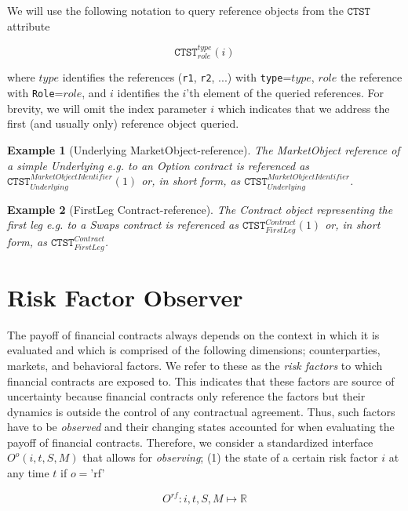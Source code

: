 \documentclass[9pt,oneside]{amsart}
\newtheorem{example}{Example}
\newcommand{\Real}{\mathbb{R}}
\newcommand{\attr}[1]{\texttt{#1}}
\newcommand{\obsfull}[5]{O^{#1}(#2,#3,#4,#5)}
\newcommand{\obsfunc}[1]{O^{#1}}
\begin{document}
\begin{multicols}{2}
We will use the following notation to query reference objects from the $\attr{CTST}$ attribute

\[
	\attr{CTST}_{role}^{type}(i)
\]

where $type$ identifies the references (\verb'r1', \verb'r2', ...) with \verb'type'=$type$, $role$ the reference with \verb'Role'=$role$, and $i$ identifies the $i$'th element of the queried references. For brevity, we will omit the index parameter $i$ which indicates that we address the first (and usually only) reference object queried.

\begin{example}[Underlying MarketObject-reference] The MarketObject reference of a simple Underlying e.g. to an Option contract is referenced as $\attr{CTST}_{Underlying}^{MarketObjectIdentifier}(1)$ or, in short form, as $\attr{CTST}_{Underlying}^{MarketObjectIdentifier}$.
\end{example}

\begin{example}[FirstLeg Contract-reference] The Contract object representing the first leg e.g. to a Swaps contract is referenced as $\attr{CTST}_{FirstLeg}^{Contract}(1)$ or, in short form, as $\attr{CTST}_{FirstLeg}^{Contract}$.
\end{example}



\section{Risk Factor Observer}\label{sec:rfobserver}

The payoff of financial contracts always depends on the context in which it is evaluated and which is comprised of the following dimensions; counterparties, markets, and behavioral factors. We refer to these as the \textit{risk factors} to which financial contracts are exposed to. This indicates that these factors are source of uncertainty because financial contracts only reference the factors but their dynamics is outside the control of any contractual agreement. Thus, such factors have to be \textit{observed} and their changing states accounted for when evaluating the payoff of financial contracts. Therefore, we consider a standardized interface $\obsfull{o}{i}{t}{S}{M}$ that allows for \textit{observing}; (1) the state of a certain risk factor $i$ at any time $t$ if $o=$'rf'

\[
	\obsfunc{rf}: i,t,S,M \mapsto \Real
\]


\end{multicols}
\end{document}
